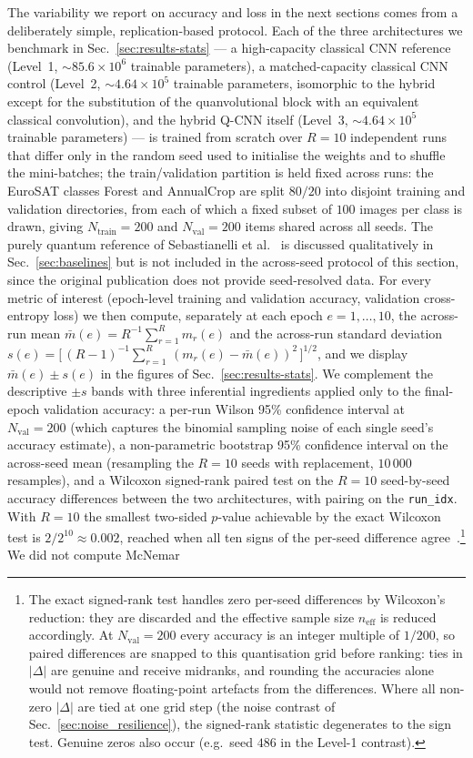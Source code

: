 The variability we report on accuracy and loss in the next sections comes
from a deliberately simple, replication-based protocol. Each of the three
architectures we benchmark in Sec.~\ref{sec:results-stats} — a
high-capacity classical CNN reference (Level~1, $\sim 85.6\times 10^{6}$
trainable parameters), a matched-capacity classical CNN control
(Level~2, $\sim 4.64\times 10^{5}$ trainable parameters, isomorphic to
the hybrid except for the substitution of the quanvolutional block with
an equivalent classical convolution), and the hybrid Q-CNN itself
(Level~3, $\sim 4.64\times 10^{5}$ trainable parameters) — is trained
from scratch over $R=10$ independent runs that differ only in the
random seed used to initialise the weights and to shuffle the
mini-batches; the train/validation partition is held fixed across runs: the EuroSAT
classes Forest and AnnualCrop are split $80/20$ into disjoint training and
validation directories, from each of which a fixed subset of $100$ images
per class is drawn, giving $N_{\mathrm{train}}=200$ and $N_{\mathrm{val}}=200$
items shared across all seeds. The purely quantum reference of
Sebastianelli et al.~\cite{Sebastianelli2021} is discussed qualitatively
in Sec.~\ref{sec:baselines} but is not included in the across-seed
protocol of this section, since the original publication does not
provide seed-resolved data. For every metric of
interest (epoch-level training and validation accuracy, validation
cross-entropy loss) we then compute, separately at each epoch
$e=1,\dots,10$, the across-run mean
\(
\bar{m}(e) = R^{-1}\sum_{r=1}^{R} m_r(e)
\)
and the across-run standard deviation
\(
s(e) = \bigl[\,(R-1)^{-1}\sum_{r=1}^{R}\,(m_r(e)-\bar{m}(e))^{2}\,\bigr]^{1/2}
\),
and we display $\bar{m}(e)\pm s(e)$ in the figures of
Sec.~\ref{sec:results-stats}. We complement the descriptive $\pm s$ bands
with three inferential ingredients applied only to the final-epoch validation
accuracy: a per-run Wilson 95\% confidence interval at $N_{\mathrm{val}}=200$
(which captures the binomial sampling noise of each single seed's
accuracy estimate), a non-parametric bootstrap 95\% confidence interval on
the across-seed mean (resampling the $R=10$ seeds with replacement,
$10\,000$ resamples), and a Wilcoxon signed-rank paired test on the $R=10$
seed-by-seed accuracy differences between the two architectures, with
pairing on the \texttt{run\_idx}. With $R=10$ the smallest two-sided
$p$-value achievable by the exact Wilcoxon test is
$2/2^{10}\approx 0.002$, reached when all ten signs of the per-seed
difference agree~\cite{Wilcoxon1945}.\footnote{The exact signed-rank test handles zero per-seed differences by Wilcoxon's reduction: they are discarded and the effective sample size $n_{\mathrm{eff}}$ is reduced accordingly. At $N_{\mathrm{val}}=200$ every accuracy is an integer multiple of $1/200$, so paired differences are snapped to this quantisation grid before ranking: ties in $|\Delta|$ are genuine and receive midranks, and rounding the accuracies alone would not remove floating-point artefacts from the differences. Where all non-zero $|\Delta|$ are tied at one grid step (the noise contrast of Sec.~\ref{sec:noise_resilience}), the signed-rank statistic degenerates to the sign test. Genuine zeros also occur (e.g.\ seed $486$ in the Level-1 contrast).} We did not compute McNemar
